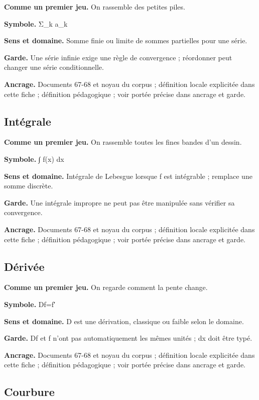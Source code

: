 \documentclass[
  9pt,
  a4paper,
]{article}
\begin{document}
\textbf{Comme un premier jeu.} On rassemble des petites piles.

\textbf{Symbole.} Σ\_k a\_k

\textbf{Sens et domaine.} Somme finie ou limite de sommes partielles
pour une série.

\textbf{Garde.} Une série infinie exige une règle de convergence ;
réordonner peut changer une série conditionnelle.

\textbf{Ancrage.} Documents 67-68 et noyau du corpus ; définition locale
explicitée dans cette fiche ; définition pédagogique ; voir portée
précise dans ancrage et garde.

\hypertarget{intuxe9grale}{%
\subsection{Intégrale}\label{intuxe9grale}}

\textbf{Comme un premier jeu.} On rassemble toutes les fines bandes d'un
dessin.

\textbf{Symbole.} ∫ f(x) dx

\textbf{Sens et domaine.} Intégrale de Lebesgue lorsque f est intégrable
; remplace une somme discrète.

\textbf{Garde.} Une intégrale impropre ne peut pas être manipulée sans
vérifier sa convergence.

\textbf{Ancrage.} Documents 67-68 et noyau du corpus ; définition locale
explicitée dans cette fiche ; définition pédagogique ; voir portée
précise dans ancrage et garde.

\hypertarget{duxe9rivuxe9e}{%
\subsection{Dérivée}\label{duxe9rivuxe9e}}

\textbf{Comme un premier jeu.} On regarde comment la pente change.

\textbf{Symbole.} Df=f′

\textbf{Sens et domaine.} D est une dérivation, classique ou faible
selon le domaine.

\textbf{Garde.} Df et f n'ont pas automatiquement les mêmes unités ; dx
doit être typé.

\textbf{Ancrage.} Documents 67-68 et noyau du corpus ; définition locale
explicitée dans cette fiche ; définition pédagogique ; voir portée
précise dans ancrage et garde.

\hypertarget{courbure}{%
\subsection{Courbure}\label{courbure}}
\end{document}
